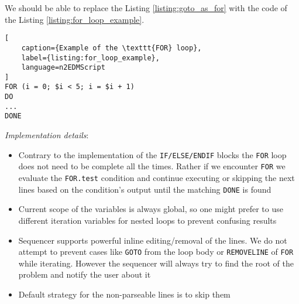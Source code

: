 We should be able to replace the Listing \ref{listing:goto_as_for} with the code of the Listing \ref{listing:for_loop_example}.
\begin{lstlisting}[
	caption={Example of the \texttt{FOR} loop}, 
	label={listing:for_loop_example},
	language=n2EDMScript
]
FOR (i = 0; $i < 5; i = $i + 1)
DO
...
DONE
\end{lstlisting}

\textit{Implementation details}: 

\begin{itemize}
	\item Contrary to the implementation of the \texttt{IF/ELSE/ENDIF} blocks the \texttt{FOR} loop does not need to be complete all the times. Rather if we encounter \texttt{FOR} we evaluate the \texttt{FOR.test} condition and continue executing or skipping the next lines based on the condition's output until the matching \texttt{DONE} is found
	\item Current scope of the variables is always global, so one might prefer to use different iteration variables for nested loops to prevent confusing results
	\item Sequencer supports powerful inline editing/removal of the lines. We do not attempt to prevent cases like \texttt{GOTO} from the loop body or \texttt{REMOVELINE} of \texttt{FOR} while iterating. However the sequencer will always try to find the root of the problem and notify the user about it
	\item Default strategy for the non-parseable lines is to skip them
\end{itemize}

%
%
%
%
%
%
%
